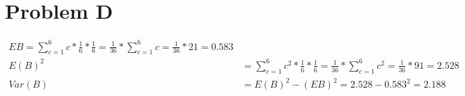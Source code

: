 \section{Problem D}
\begin{align*}

    EB =  \sum_{c=1}^{6} c * \frac{1}{6} * \frac{1}{6}  
    = \frac{1}{36}*\sum_{c=1}^{6} c 
    = \frac{1}{36} * 21 = 0.583 \\
    
    E(B)^2 &= \sum_{c=1}^{6} c^2 * \frac{1}{6} * \frac{1}{6}  
    = \frac{1}{36}*\sum_{c=1}^{6} c^2 
    = \frac{1}{36} * 91 = 2.528 \\
    
    Var(B) &=  E(B)^2 - (EB)^2 = 2.528 - 0.583^2 = 2.188 \\
    
\end{align*}
